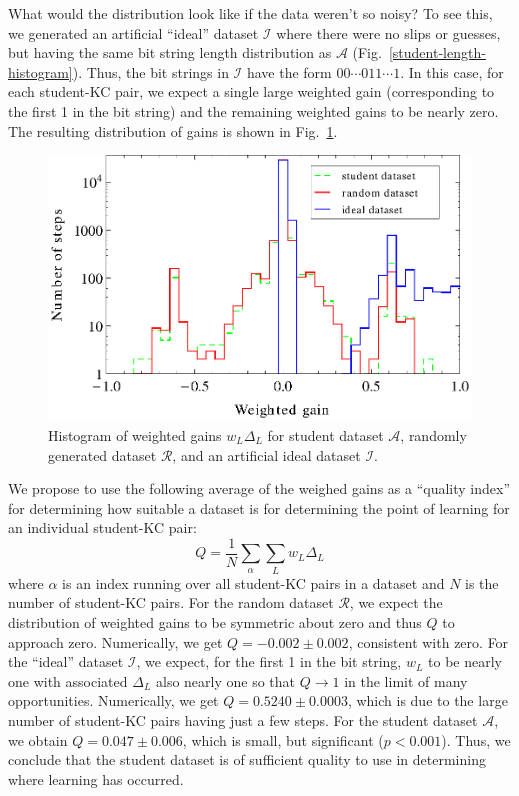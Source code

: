 \documentclass[prodmode,acmtecs]{acmsmall}
\begin{document}
What would the distribution look like if the data weren't 
so noisy?  To see this, we generated an artificial ``ideal'' dataset
$\mathcal{I}$ where there were no slips or guesses, but having
the same bit string length distribution as $\mathcal{A}$ 
(Fig.~\ref{student-length-histogram}).  Thus, the bit strings
in $\mathcal{I}$ have the form $00\cdots011\cdots1$.
In this case, for each student-KC pair, we expect a single 
large weighted gain (corresponding to the first 1 in the bit string) 
and the remaining weighted gains to be nearly zero.  The resulting 
distribution of gains is shown
in  Fig.~\ref{weighted-gain-histogram2}.

\begin{figure}
  \centering \includegraphics{weighted-gain-histogram2.eps}
   \caption{Histogram of weighted gains $w_L \Delta_L$ for
     student dataset $\mathcal{A}$, randomly generated dataset $\mathcal{R}$,
     and an artificial ideal dataset $\mathcal{I}$.}
    \label{weighted-gain-histogram2}
\end{figure}


We propose to use the following average of the weighed gains as
a ``quality index'' for determining how suitable a 
dataset is for determining the point of learning for an individual
student-KC pair:
%
\begin{equation}
           Q= \frac{1}{N} \sum_\alpha \sum_L w_L \Delta_L
\end{equation}
%
where $\alpha$ is an index running over all student-KC pairs in a 
dataset and $N$ is the number of student-KC pairs.
For the random dataset $\mathcal{R}$, we expect the distribution of 
weighted gains to be symmetric about zero and thus $Q$ to approach zero.  
Numerically, we get  $Q=-0.002\pm0.002$, consistent with zero.
For the ``ideal'' dataset $\mathcal{I}$,
we expect, for the first 1 in the bit string, $w_L$ to be nearly one 
with associated $\Delta_L$ also nearly one so that $Q\to 1$ in
the limit of many opportunities.
Numerically, we get $Q=0.5240\pm0.0003$, which is due to the 
large number of student-KC pairs having just a few steps.  
For the student dataset $\mathcal{A}$, we obtain $Q=0.047\pm0.006$, which
is small, but significant ($p<0.001$). Thus, we conclude that the
student dataset is of sufficient quality to use in determining where learning has occurred.
\end{document}
